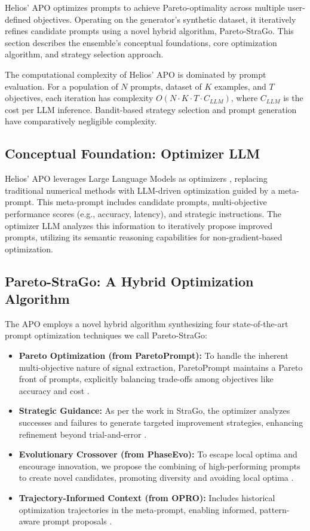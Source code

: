 \documentclass{article}
\begin{document}
Helios' APO optimizes prompts to achieve Pareto-optimality across multiple user-defined objectives. Operating on the generator's synthetic dataset, it iteratively refines candidate prompts using a novel hybrid algorithm, Pareto-StraGo. This section describes the ensemble's conceptual foundations, core optimization algorithm, and strategy selection approach.

The computational complexity of Helios' APO is dominated by prompt evaluation. For a population of $N$ prompts, dataset of $K$ examples, and $T$ objectives, each iteration has complexity $O(N \cdot K \cdot T \cdot C_{LLM})$, where $C_{LLM}$ is the cost per LLM inference. Bandit-based strategy selection and prompt generation have comparatively negligible complexity.

\subsection{Conceptual Foundation: Optimizer LLM}
Helios' APO leverages Large Language Models as optimizers \citep{yang2024largelanguagemodelsoptimizers}, replacing traditional numerical methods with LLM-driven optimization guided by a meta-prompt. This meta-prompt includes candidate prompts, multi-objective performance scores (e.g., accuracy, latency), and strategic instructions. The optimizer LLM analyzes this information to iteratively propose improved prompts, utilizing its semantic reasoning capabilities for non-gradient-based optimization.

\subsection{Pareto-StraGo: A Hybrid Optimization Algorithm}
The APO employs a novel hybrid algorithm synthesizing four state-of-the-art prompt optimization techniques we call Pareto-StraGo:

\begin{itemize}
  \item \textbf{Pareto Optimization (from ParetoPrompt):} To handle the inherent multi-objective nature of signal extraction, ParetoPrompt maintains a Pareto front of prompts, explicitly balancing trade-offs among objectives like accuracy and cost \citep{zhao2025pareto}.
  \item \textbf{Strategic Guidance:} As per the work in StraGo, the optimizer analyzes successes and failures to generate targeted improvement strategies, enhancing refinement beyond trial-and-error \citep{wu2024stragoharnessingstrategicguidance}.
  \item \textbf{Evolutionary Crossover (from PhaseEvo):} To escape local optima and encourage innovation, we propose the combining of high-performing prompts to create novel candidates, promoting diversity and avoiding local optima \citep{cui2024phaseevounifiedincontextprompt}.
  \item \textbf{Trajectory-Informed Context (from OPRO):} Includes historical optimization trajectories in the meta-prompt, enabling informed, pattern-aware prompt proposals \citep{yang2024largelanguagemodelsoptimizers}.
\end{itemize}
\end{document}
